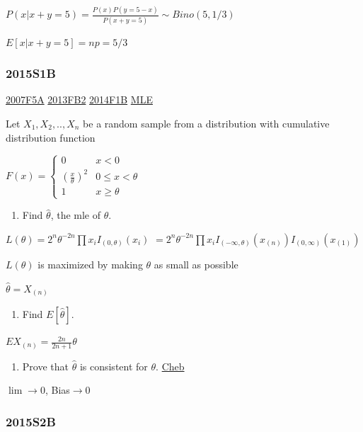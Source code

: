\documentclass[10pt,twocolumn,portrait]{article}
\providecommand{\tightlist}{%
  \setlength{\itemsep}{0pt}\setlength{\parskip}{0pt}}
\begin{document}
\(P(x|x+y=5)=\frac{P(x)P(y=5-x)}{P(x+y=5)}\sim Bino(5,1/3)\)

\(E[x|x+y=5]=np=5/3\)

\hypertarget{s1b-1}{%
\subsubsection{2015S1B}\label{s1b-1}}

\protect\hyperlink{f5a}{2007F5A} \protect\hyperlink{fb2-2}{2013FB2}
\protect\hyperlink{f1b-1}{2014F1B} \protect\hyperlink{MLE}{MLE}

Let \(X_1,X_2,..,X_n\) be a random sample from a distribution with
cumulative distribution function

\(F(x)=\begin{cases}0&x<0\\(\frac{x}\theta)^2& 0\le x<\theta\\1& x\ge\theta\end{cases}\)

\begin{enumerate}
\def\labelenumi{(\alph{enumi})}
\tightlist
\item
  Find \(\hat\theta\), the mle of \(\theta\).
\end{enumerate}

\(L(\theta)=2^n\theta^{-2n}\prod x_i I_{(0,\theta)}(x_i)\)
\(=2^n\theta^{-2n}\prod x_i I_{(-\infty,\theta)}(x_{(n)})I_{(0,\infty)}(x_{(1)})\)

\(L(\theta)\) is maximized by making \(\theta\) as small as possible

\(\hat\theta=X_{(n)}\)

\begin{enumerate}
\def\labelenumi{(\alph{enumi})}
\setcounter{enumi}{1}
\tightlist
\item
  Find \(E[\hat\theta]\).
\end{enumerate}

\(EX_{(n)}=\frac{2n}{2n+1}\theta\)

\begin{enumerate}
\def\labelenumi{(\alph{enumi})}
\setcounter{enumi}{2}
\tightlist
\item
  Prove that \(\hat\theta\) is consistent for \(\theta\).
  \protect\hyperlink{Cheb}{Cheb}
\end{enumerate}

\(\lim\to0\), Bias\(\to0\)

\hypertarget{s2b-1}{%
\subsubsection{2015S2B}\label{s2b-1}}
\end{document}
